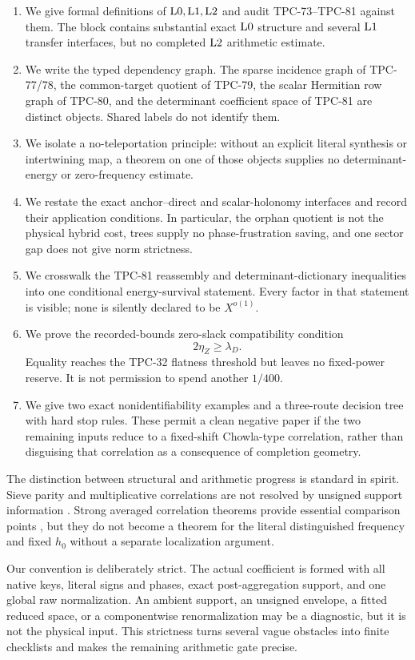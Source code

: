 \begin{enumerate}[label=(\roman*),leftmargin=2.2em]
\item We give formal definitions of \(\mathrm{L0},\mathrm{L1},\mathrm{L2}\) and audit
TPC-73--TPC-81 against them.  The block contains substantial exact
\(\mathrm{L0}\) structure and several \(\mathrm{L1}\) transfer interfaces, but no
completed \(\mathrm{L2}\) arithmetic estimate.
\item We write the typed dependency graph.  The sparse incidence
graph of TPC-77/78, the common-target quotient of TPC-79, the scalar
Hermitian row graph of TPC-80, and the determinant coefficient space
of TPC-81 are distinct objects.  Shared labels do not identify them.
\item We isolate a no-teleportation principle: without an explicit
literal synthesis or intertwining map, a theorem on one of those
objects supplies no determinant-energy or zero-frequency estimate.
\item We restate the exact anchor--direct and scalar-holonomy
interfaces and record their application conditions.  In particular,
the orphan quotient is not the physical hybrid cost, trees supply no
phase-frustration saving, and one sector gap does not give norm
strictness.
\item We crosswalk the TPC-81 reassembly and determinant-dictionary
inequalities into one conditional energy-survival statement.  Every
factor in that statement is visible; none is silently declared to be
\(X^{o(1)}\).
\item We prove the recorded-bounds zero-slack compatibility condition
\[
 2\eta_Z\ge\lambda_D.
\]
Equality reaches the TPC-32 flatness threshold but leaves no
fixed-power reserve.  It is not permission to spend another
\(1/400\).
\item We give two exact nonidentifiability examples and a three-route
decision tree with hard stop rules.  These permit a clean negative
paper if the two remaining inputs reduce to a fixed-shift
Chowla-type correlation, rather than disguising that correlation as
a consequence of completion geometry.
\end{enumerate}

The distinction between structural and arithmetic progress is
standard in spirit.  Sieve parity and multiplicative correlations
are not resolved by unsigned support information
\citep{HeathBrown1982Parity,IwaniecKowalski2004}.  Strong averaged
correlation theorems provide essential comparison points
\citep{MatomakiRadziwillTao2015,Tao2016LogChowla}, but they do not
become a theorem for the literal distinguished frequency and fixed
\(h_0\) without a separate localization argument.

Our convention is deliberately strict.  The actual coefficient is
formed with all native keys, literal signs and phases, exact
post-aggregation support, and one global raw normalization.  An
ambient support, an unsigned envelope, a fitted reduced space, or a
componentwise renormalization may be a diagnostic, but it is not the
physical input.  This strictness turns several vague obstacles into
finite checklists and makes the remaining arithmetic gate precise.
